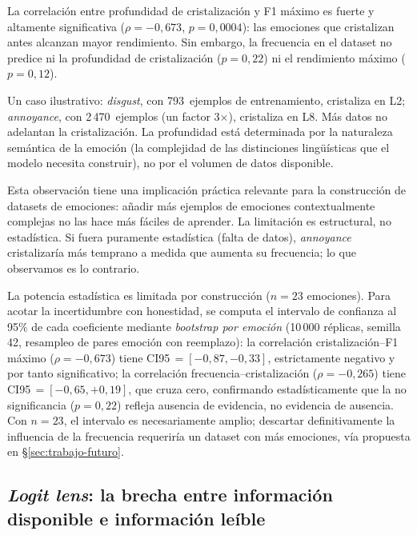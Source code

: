 La correlación entre profundidad de cristalización y F1 máximo es fuerte
y altamente significativa ($\rho = -0{,}673$, $p = 0{,}0004$): las
emociones que cristalizan antes alcanzan mayor rendimiento. Sin embargo,
la frecuencia en el dataset no predice ni la profundidad de
cristalización ($p = 0{,}22$) ni el rendimiento máximo ($p = 0{,}12$).

Un caso ilustrativo: \emph{disgust}, con 793~ejemplos de entrenamiento,
cristaliza en L2; \emph{annoyance}, con 2\,470~ejemplos (un factor
3$\times$), cristaliza en L8. Más datos no adelantan la cristalización.
La profundidad está determinada por la naturaleza semántica de
la emoción (la complejidad de las distinciones lingüísticas que el
modelo necesita construir), no por el volumen de datos disponible.

Esta observación tiene una implicación práctica relevante para la
construcción de datasets de emociones: añadir más ejemplos de emociones
contextualmente complejas no las hace más fáciles de aprender. La
limitación es estructural, no estadística. Si fuera puramente estadística
(falta de datos), \emph{annoyance} cristalizaría más temprano a medida
que aumenta su frecuencia; lo que observamos es lo contrario.

La potencia estadística es limitada por construcción ($n=23$ emociones).
Para acotar la incertidumbre con honestidad, se computa el intervalo de
confianza al 95\% de cada coeficiente mediante \emph{bootstrap por
emoción} (10\,000 réplicas, semilla 42, resampleo de pares emoción
con reemplazo): la correlación cristalización--F1 máximo
($\rho = -0{,}673$) tiene CI95\,$=[-0{,}87, -0{,}33]$, estrictamente
negativo y por tanto significativo; la correlación
frecuencia--cristalización ($\rho = -0{,}265$) tiene
CI95\,$=[-0{,}65, +0{,}19]$, que cruza cero, confirmando estadísticamente
que la no significancia ($p=0{,}22$) refleja ausencia de evidencia, no
evidencia de ausencia. Con $n=23$, el intervalo es necesariamente
amplio; descartar definitivamente la influencia de la frecuencia
requeriría un dataset con más emociones, vía propuesta en
\S\ref{sec:trabajo-futuro}.



\subsection{\emph{Logit lens}: la brecha entre información disponible e información leíble}
\label{sec:logit-lens}

